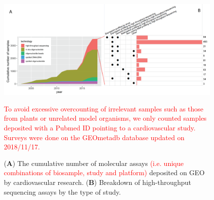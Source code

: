 \documentclass[letter]{bioinfo}
\newcommand{\comment}[1]{\textcolor{red}{#1}}
\begin{document}
\begin{figure}[!tpb]
	\includegraphics[width=1\linewidth]{assay-count-cardio}
	\caption{(\textbf{A}) The cumulative number of molecular assays \comment{(i.e. unique combinations of biosample, study and platform)} deposited on GEO by cardiovascular research. (\textbf{B}) Breakdown of high-throughput sequencing assays by the type of study.}
	\label{fig:geo-assay}\comment{To avoid excessive overcounting of irrelevant samples such as those from plants or unrelated model organisms, we only counted samples deposited with a Pubmed ID pointing to a cardiovascular study. Surveys were done on the GEOmetadb database \citep{Zhu:2008:GEOmetadb} updated on 2018/11/17.}
\end{figure} 


\end{document}

